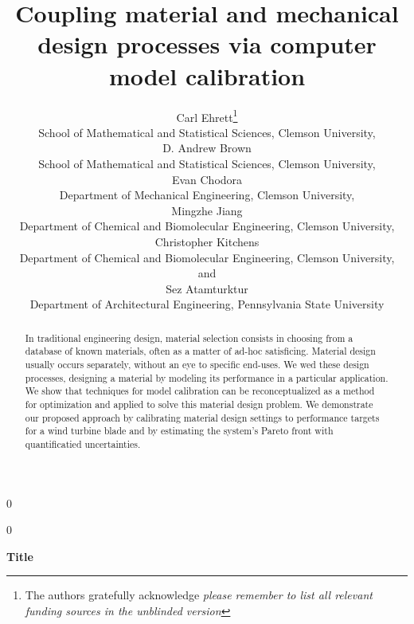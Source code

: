 \documentclass[12pt]{article}
\newcommand{\blind}{0}
\begin{document}
%

\def\spacingset#1{\renewcommand{\baselinestretch}%
{#1}\small\normalsize} \spacingset{1}



\blind
{
  \title{\bf Coupling material and mechanical design processes via computer model calibration}
  \author{Carl Ehrett\thanks{
    The authors gratefully acknowledge \textit{please remember to list all relevant funding sources in the unblinded version}}\hspace{.2cm}\\
    School of Mathematical and Statistical Sciences, Clemson University,\\
    D. Andrew Brown \\
    School of Mathematical and Statistical Sciences, Clemson University,\\
    Evan Chodora \\
    Department of Mechanical Engineering, Clemson University,\\
    Mingzhe Jiang \\
    Department of Chemical and Biomolecular Engineering, Clemson University,\\
    Christopher Kitchens \\
    Department of Chemical and Biomolecular Engineering, Clemson University,\\
    and \\
    Sez Atamturktur \\
    Department of Architectural Engineering, Pennsylvania State University\\}
  \maketitle
} \fi

\blind
{
  \bigskip
  \bigskip
  \bigskip
  \begin{center}
    {\LARGE\bf Title}
\end{center}
  \medskip
} \fi

\bigskip
\begin{abstract}
In traditional engineering design, material selection consists in choosing from a database of known materials, often as a matter of ad-hoc satisficing. 
%
Material design usually occurs separately, without an eye to specific end-uses.
%
We wed these design processes, designing a material by modeling its performance in a particular application. 
%
We show that techniques for model calibration can be reconceptualized as a method for optimization and applied to solve this material design problem. 
%
We demonstrate our proposed approach by calibrating material design settings to performance targets for a wind turbine blade and by estimating the system's Pareto front with quantificatied uncertainties. 
\end{abstract}
\end{document}
